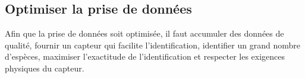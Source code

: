 

\subsection{Optimiser la prise de données}
\label{s:beo_obj_optimdonn}

Afin que la prise de données soit optimisée, il faut accumuler des données de qualité, fournir un capteur qui facilite l’identification, identifier un grand nombre d’espèces, maximiser l’exactitude de l’identification et respecter les exigences physiques du capteur.